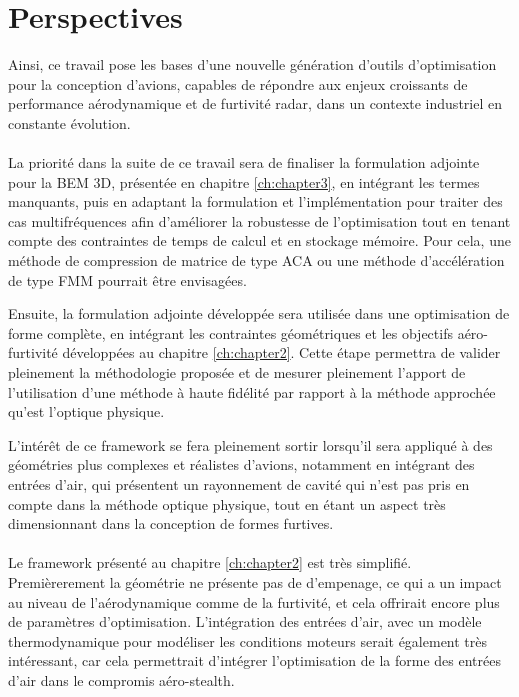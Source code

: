 \section{Perspectives}

Ainsi, ce travail pose les bases d'une nouvelle génération d'outils d'optimisation pour la conception d'avions, capables de répondre aux enjeux croissants de performance aérodynamique et de furtivité radar, dans un contexte industriel en constante évolution.

\paragraph{}
La priorité dans la suite de ce travail sera de finaliser la formulation adjointe pour la BEM 3D, présentée en chapitre \ref{ch:chapter3}, en intégrant les termes manquants, puis en adaptant la formulation et l'implémentation pour traiter des cas multifréquences afin d'améliorer la robustesse de l'optimisation tout en tenant compte des contraintes de temps de calcul et en stockage mémoire. Pour cela, une méthode de compression de matrice de type ACA \citep{Bebendorf2000} ou une méthode d'accélération de type FMM \citep{Greengard1988} pourrait être envisagées.

Ensuite, la formulation adjointe développée sera utilisée dans une optimisation de forme complète, en intégrant les contraintes géométriques et les objectifs aéro-furtivité développées au chapitre \ref{ch:chapter2}. Cette étape permettra de valider pleinement la méthodologie proposée et de mesurer pleinement l'apport de l'utilisation d'une méthode à haute fidélité par rapport à la méthode approchée qu'est l'optique physique.

L'intérêt de ce framework se fera pleinement sortir lorsqu'il sera appliqué à des géométries plus complexes et réalistes d'avions, notamment en intégrant des entrées d'air, qui présentent un rayonnement de cavité \citep{Anastassiu2004} qui n'est pas pris en compte dans la méthode optique physique, tout en étant un aspect très dimensionnant dans la conception de formes furtives.

\paragraph{}
Le framework présenté au chapitre \ref{ch:chapter2} est très simplifié. Premièrerement la géométrie ne présente pas de d'empenage, ce qui a un impact au niveau de l'aérodynamique comme de la furtivité, et cela offrirait encore plus de paramètres d'optimisation. L'intégration des entrées d'air, avec un modèle thermodynamique pour modéliser les conditions moteurs serait également très intéressant, car cela permettrait d'intégrer l'optimisation de la forme des entrées d'air dans le compromis aéro-stealth. 

